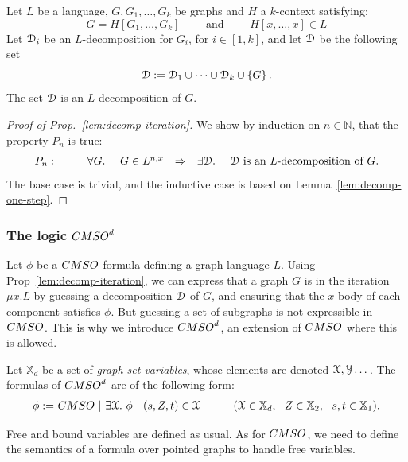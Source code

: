 \begin{lemma}\label{lem:decomp-one-step}
Let $L$ be a language, $G, G_1,\dots, G_k$ be graphs and $H$ a $k$-context satisfying:
 $$G=H[G_1,\dots, G_k]\qquad\text{ and }\qquad H[x,\dots,x]\in L$$
Let $\mathcal D_i$ be an $L$-decomposition for $G_i$, for $i\in [1,k]$, and let $\mathcal D$ be the following set
 $$\mathcal D:=\mathcal D_1\cup \dots\cup \mathcal D_k\cup\left\{G\right\}.$$
 The set $\mathcal D$ is an $L$-decomposition of $G$.
\end{lemma}

\begin{proof}[Proof of Prop.~\ref{lem:decomp-iteration}]
We show by induction on $n\in\mathbb{N}$, that the  property $P_n$ is true:
$$\begin{array}{lrll}
P_n:&\qquad\forall G.\ \quad G\in L^{n,x}& \Rightarrow& \exists \mathcal D. \ \quad\mathcal D \text{ is an $L$-decomposition of $G$.} 
\end{array}
$$
The base case is trivial, and the inductive case is based on Lemma~\ref{lem:decomp-one-step}.
\end{proof}



\subsubsection{The logic $\CMSOd$}
Let $\phi$ be a $\CMSO$ formula defining a graph language $L$. Using Prop~\ref{lem:decomp-iteration}, we can express that a graph $G$ is in the iteration $\mu x. L$ by guessing a decomposition $\mathcal D$ of $G$, and ensuring that the $x$-body of each component  satisfies $\phi$.   But guessing a set of subgraphs is not expressible in $\CMSO$. This is why we introduce $\CMSOd$, an extension of $\CMSO$ where this is allowed. 


\begin{definition} Let $\mathbb{X}_d$ be a set of \emph{graph set variables}, whose elements are denoted $\mathcal X, \mathcal Y\dots$. The formulas of $\CMSOd$ are of the following form:
\begin{align*}
 \phi :=&\ \CMSO\ |\ \exists \cX.\ \phi\ |\ (s,Z,t)\in \cX & \qquad (\cX\in \mathbb{X}_d, \ \ Z\in \mathbb{X}_2,\ \  s,t\in\mathbb{X}_1).
\end{align*}
\end{definition}
Free and bound variables are defined as usual.  As for $\CMSO$, we need to define the semantics of a formula over pointed graphs to handle free variables. 

